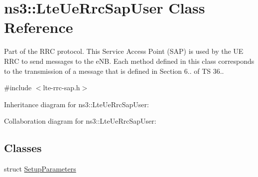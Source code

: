 \hypertarget{classns3_1_1LteUeRrcSapUser}{}\section{ns3\+:\+:Lte\+Ue\+Rrc\+Sap\+User Class Reference}
\label{classns3_1_1LteUeRrcSapUser}


Part of the R\+RC protocol. This Service Access Point (S\+AP) is used by the UE R\+RC to send messages to the e\+NB. Each method defined in this class corresponds to the transmission of a message that is defined in Section 6.. of TS 36..  




{\ttfamily \#include $<$lte-\/rrc-\/sap.\+h$>$}



Inheritance diagram for ns3\+:\+:Lte\+Ue\+Rrc\+Sap\+User\+:


Collaboration diagram for ns3\+:\+:Lte\+Ue\+Rrc\+Sap\+User\+:
\subsection*{Classes}
\begin{DoxyCompactItemize}
\item 
struct \hyperlink{structns3_1_1LteUeRrcSapUser_1_1SetupParameters}{Setup\+Parameters}
\end{DoxyCompactItemize}
